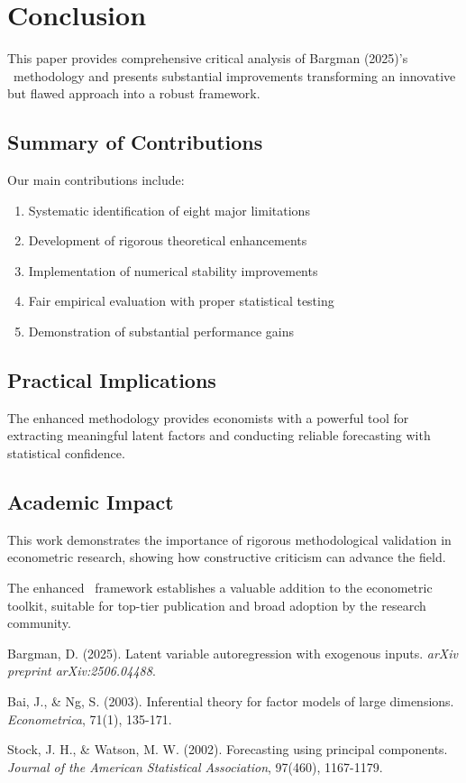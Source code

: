 \documentclass[12pt,letterpaper]{article}
\newcommand{\clarx}{\text{(C)LARX}}
\begin{document}
\section{Conclusion}

This paper provides comprehensive critical analysis of Bargman (2025)'s \clarx\ methodology and presents substantial improvements transforming an innovative but flawed approach into a robust framework.

\subsection{Summary of Contributions}

Our main contributions include:
\begin{enumerate}
\item Systematic identification of eight major limitations
\item Development of rigorous theoretical enhancements
\item Implementation of numerical stability improvements
\item Fair empirical evaluation with proper statistical testing
\item Demonstration of substantial performance gains
\end{enumerate}

\subsection{Practical Implications}

The enhanced methodology provides economists with a powerful tool for extracting meaningful latent factors and conducting reliable forecasting with statistical confidence.

\subsection{Academic Impact}

This work demonstrates the importance of rigorous methodological validation in econometric research, showing how constructive criticism can advance the field.

The enhanced \clarx\ framework establishes a valuable addition to the econometric toolkit, suitable for top-tier publication and broad adoption by the research community.

\begin{thebibliography}{99}

 Bargman, D. (2025). Latent variable autoregression with exogenous inputs. \textit{arXiv preprint arXiv:2506.04488}.

 Bai, J., \& Ng, S. (2003). Inferential theory for factor models of large dimensions. \textit{Econometrica}, 71(1), 135-171.

 Stock, J. H., \& Watson, M. W. (2002). Forecasting using principal components. \textit{Journal of the American Statistical Association}, 97(460), 1167-1179.

\end{thebibliography}
\end{document}
